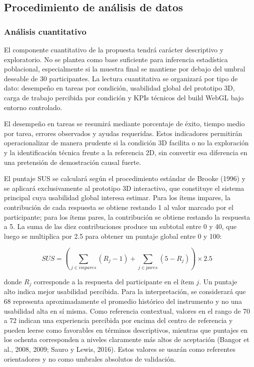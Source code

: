 \subsection{Procedimiento de an\'alisis de datos}

\subsubsection{An\'alisis cuantitativo}

El componente cuantitativo de la propuesta tendr\'a car\'acter descriptivo y exploratorio. No se plantea como base suficiente para inferencia estad\'istica poblacional, especialmente si la muestra final se mantiene por debajo del umbral deseable de 30 participantes. La lectura cuantitativa se organizar\'a por tipo de dato: desempe\~no en tareas por condici\'on, usabilidad global del prototipo 3D, carga de trabajo percibida por condici\'on y KPIs t\'ecnicos del build WebGL bajo entorno controlado.

El desempe\~no en tareas se resumir\'a mediante porcentaje de \'exito, tiempo medio por tarea, errores observados y ayudas requeridas. Estos indicadores permitir\'an operacionalizar de manera prudente si la condici\'on 3D facilita o no la exploraci\'on y la identificaci\'on t\'ecnica frente a la referencia 2D, sin convertir esa diferencia en una pretensi\'on de demostraci\'on causal fuerte.

El puntaje SUS se calcular\'a seg\'un el procedimiento est\'andar de Brooke (1996) y se aplicar\'a exclusivamente al prototipo 3D interactivo, que constituye el sistema principal cuya usabilidad global interesa estimar. Para los \'items impares, la contribuci\'on de cada respuesta se obtiene restando 1 al valor marcado por el participante; para los \'items pares, la contribuci\'on se obtiene restando la respuesta a 5. La suma de las diez contribuciones produce un subtotal entre 0 y 40, que luego se multiplica por 2.5 para obtener un puntaje global entre 0 y 100:

\[
SUS = \left(\sum_{j \in impares}(R_j - 1) + \sum_{j \in pares}(5 - R_j)\right)\times 2.5
\]

donde $R_j$ corresponde a la respuesta del participante en el \'item $j$. Un puntaje alto indica mejor usabilidad percibida. Para la interpretaci\'on, se considerar\'a que 68 representa aproximadamente el promedio hist\'orico del instrumento y no una usabilidad alta en s\'i misma. Como referencia contextual, valores en el rango de 70 a 72 indican una experiencia percibida por encima del centro de referencia y pueden leerse como favorables en t\'erminos descriptivos, mientras que puntajes en los ochenta corresponden a niveles claramente m\'as altos de aceptaci\'on (Bangor et al., 2008, 2009; Sauro y Lewis, 2016). Estos valores se usar\'an como referentes orientadores y no como umbrales absolutos de validaci\'on.

